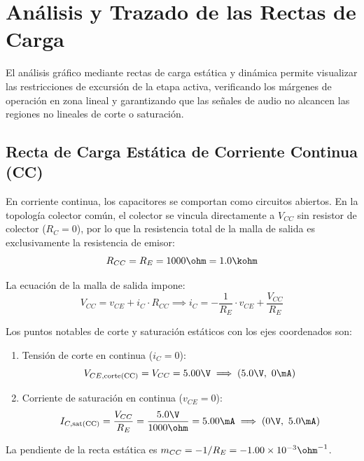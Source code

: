 \chapter{Análisis y Trazado de las Rectas de Carga}
\label{chap:rectas_de_carga}

El análisis gráfico mediante rectas de carga estática y dinámica permite visualizar las restricciones de excursión
de la etapa activa, verificando los márgenes de operación en zona lineal y garantizando que las señales de audio no
alcancen las regiones no lineales de corte o saturación.

\section{Recta de Carga Estática de Corriente Continua (CC)}

En corriente continua, los capacitores se comportan como circuitos abiertos. En la topología colector común,
el colector se vincula directamente a $V_{CC}$ sin resistor de colector ($R_C = 0$), por lo que la resistencia total
de la malla de salida es exclusivamente la resistencia de emisor:
\begin{equation}
  R_{CC} = R_E = 1000\ohm = 1.0\kohm
  \label{eq:RCC_val}
\end{equation}

La ecuación de la malla de salida impone:
\begin{equation}
  V_{CC} = v_{CE} + i_C \cdot R_{CC} \implies i_C = -\frac{1}{R_E} \cdot v_{CE} + \frac{V_{CC}}{R_E}
  \label{eq:recta_cc}
\end{equation}

Los puntos notables de corte y saturación estáticos con los ejes coordenados son:
\begin{enumerate}
  \item Tensión de corte en continua ($i_C = 0$):
    \begin{equation}
      V_{CE,\mathrm{corte(CC)}} = V_{CC} = 5.00\V \implies (5.0\V,\ 0\mA)
    \end{equation}
  \item Corriente de saturación en continua ($v_{CE} = 0$):
    \begin{equation}
      I_{C,\mathrm{sat(CC)}} = \frac{V_{CC}}{R_E} = \frac{5.0\V}{1000\ohm} = 5.00\mA \implies (0\V,\ 5.0\mA)
    \end{equation}
\end{enumerate}

La pendiente de la recta estática es $m_{CC} = -1/R_E = -1.00 \times 10^{-3}\ohm^{-1}$.

